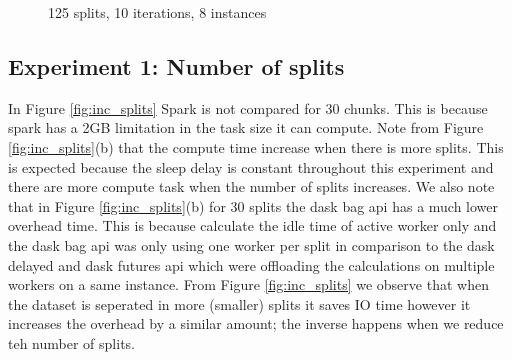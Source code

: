 \documentclass[11pt,a4paper]{article}
\begin{document}
\begin{figure}[htp]
    \centering
    
    \caption{125 splits, 10 iterations, 8 instances}
    \label{fig:inc_sleep}
\end{figure}


\subsection{Experiment 1: Number of splits}
In Figure \ref{fig:inc_splits} Spark is not compared for 30 chunks. This is because
spark has a 2GB limitation in the task size it can compute. Note from Figure
\ref{fig:inc_splits}(b) that the compute time increase when there is more splits.
This is expected because the sleep delay is constant throughout this experiment and
there are more compute task when the number of splits increases. We also note that in
Figure \ref{fig:inc_splits}(b) for 30 splits the dask bag api has a much lower
overhead time. This is because calculate the idle time of active worker only and the
dask bag api was only using one worker per split in comparison to the dask delayed
and dask futures api which were offloading the calculations on multiple workers on a
same instance. From Figure \ref{fig:inc_splits} we observe that when the dataset is
seperated in more (smaller) splits it saves IO time however it increases the overhead
by a similar amount; the inverse happens when we reduce teh number of splits.
\end{document}
